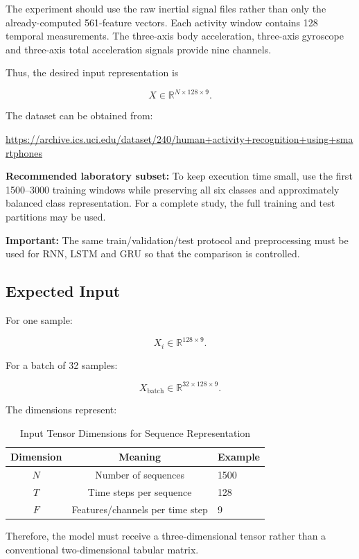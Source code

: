 \documentclass[10pt]{article}
\begin{document}
The experiment should use the raw inertial signal files rather than only the
already-computed 561-feature vectors. Each activity window contains 128
temporal measurements. The three-axis body acceleration, three-axis
gyroscope and three-axis total acceleration signals provide nine channels.

Thus, the desired input representation is

\[
X\in\mathbb{R}^{N\times128\times9}.
\]

The dataset can be obtained from:

\url{https://archive.ics.uci.edu/dataset/240/human+activity+recognition+using+smartphones}

\textbf{Recommended laboratory subset:} To keep execution time small, use
the first 1500--3000 training windows while preserving all six classes and
approximately balanced class representation. For a complete study, the full
training and test partitions may be used.

\textbf{Important:} The same train/validation/test protocol and preprocessing
must be used for RNN, LSTM and GRU so that the comparison is controlled.

\subsection{Expected Input}

For one sample:

\[
X_i\in\mathbb{R}^{128\times9}.
\]

For a batch of 32 samples:

\[
X_{\mathrm{batch}}\in\mathbb{R}^{32\times128\times9}.
\]

The dimensions represent:

\begin{table}[H]
\centering
\begin{tabular}{|c|c|l|}
\hline
Dimension & Meaning & Example\\
\hline
$N$ & Number of sequences & 1500\\
$T$ & Time steps per sequence & 128\\
$F$ & Features/channels per time step & 9\\
\hline
\end{tabular}
\caption{Input Tensor Dimensions for Sequence Representation}
\label{tab:input_dimensions}
\end{table}

Therefore, the model must receive a three-dimensional tensor rather than a
conventional two-dimensional tabular matrix.
\end{document}
